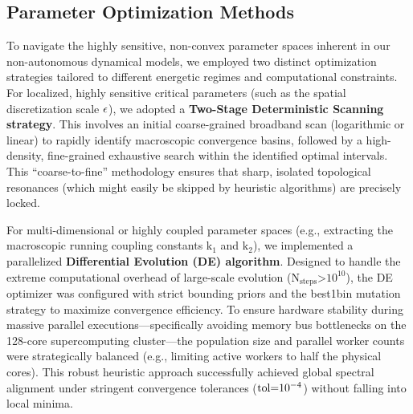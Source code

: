\documentclass[fleqn,10pt]{wlscirep}
\begin{document}
\subsection*{Parameter Optimization Methods}

To navigate the highly sensitive, non-convex parameter spaces inherent
in our non-autonomous dynamical models, we employed two distinct
optimization strategies tailored to different energetic regimes and
computational constraints. For localized, highly sensitive critical
parameters (such as the spatial discretization scale \(\text{\ensuremath{\epsilon}}\)), we
adopted a \textbf{Two-Stage Deterministic Scanning strategy}. This
involves an initial coarse-grained broadband scan (logarithmic or
linear) to rapidly identify macroscopic convergence basins, followed by
a high-density, fine-grained exhaustive search within the identified
optimal intervals. This ``coarse-to-fine'' methodology ensures that
sharp, isolated topological resonances (which might easily be skipped by
heuristic algorithms) are precisely locked.

For multi-dimensional or highly coupled parameter spaces (e.g.,
extracting the macroscopic running coupling constants
\(\text{k}_{\text{1}}\) and \(\text{k}_{\text{2}}\)), we implemented a
parallelized \textbf{Differential Evolution (DE) algorithm}. Designed to
handle the extreme computational overhead of large-scale evolution
(\(\text{N}_{\text{steps}}\text{>}\text{10}^{\text{10}}\)), the DE
optimizer was configured with strict bounding priors and the best1bin
mutation strategy to maximize convergence efficiency. To ensure hardware
stability during massive parallel executions---specifically avoiding
memory bus bottlenecks on the 128-core supercomputing cluster---the
population size and parallel worker counts were strategically balanced
(e.g., limiting active workers to half the physical cores). This robust
heuristic approach successfully achieved global spectral alignment under
stringent convergence tolerances (\(\text{tol=}\text{10}^{\text{\ensuremath{-}4}}\))
without falling into local minima.
\end{document}
